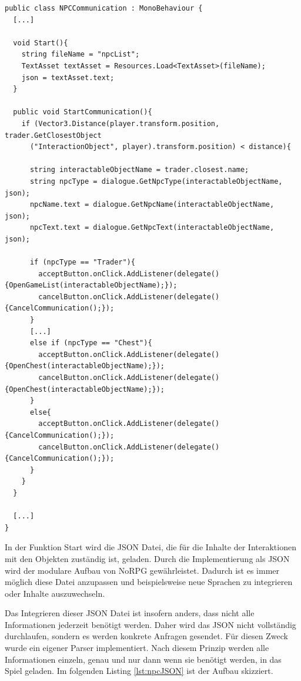 	\begin{scriptsize}
		\lstset{
			float,
			caption=Skript: NPCCommunication.cs, 
			language=[Sharp]C, 
			frame=single,  
			showstringspaces=false, 
			showspaces=false, 
			numbers=left, 
			captionpos=b, 
			belowcaptionskip=4pt,
			basicstyle=\ttfamily
		} 
		\begin{lstlisting}[label=lst:npcComm]
public class NPCCommunication : MonoBehaviour {
  [...]
	
  void Start(){
    string fileName = "npcList";
    TextAsset textAsset = Resources.Load<TextAsset>(fileName);
    json = textAsset.text;
  }

  public void StartCommunication(){
    if (Vector3.Distance(player.transform.position, trader.GetClosestObject
      ("InteractionObject", player).transform.position) < distance){
		
      string interactableObjectName = trader.closest.name;
      string npcType = dialogue.GetNpcType(interactableObjectName, json);
      npcName.text = dialogue.GetNpcName(interactableObjectName, json);
      npcText.text = dialogue.GetNpcText(interactableObjectName, json);

      if (npcType == "Trader"){
        acceptButton.onClick.AddListener(delegate(){OpenGameList(interactableObjectName);});
        cancelButton.onClick.AddListener(delegate(){CancelCommunication();});
      }
      [...]
      else if (npcType == "Chest"){
        acceptButton.onClick.AddListener(delegate(){OpenChest(interactableObjectName);});
        cancelButton.onClick.AddListener(delegate(){OpenChest(interactableObjectName);});
      }
      else{
        acceptButton.onClick.AddListener(delegate(){CancelCommunication();});
        cancelButton.onClick.AddListener(delegate(){CancelCommunication();});
      }
    }
  }
		
  [...]
}
		\end{lstlisting}
	\end{scriptsize}
	
			\label{npctext}
			In der Funktion Start wird die \ac{JSON} Datei, die für die Inhalte der Interaktionen mit den Objekten zuständig ist, geladen. Durch die Implementierung als \ac{JSON} wird der modulare Aufbau von NoRPG gewährleistet. Dadurch ist es immer möglich diese Datei anzupassen und beispielsweise neue Sprachen zu integrieren oder Inhalte auszuwechseln. 
	
			Das Integrieren dieser \ac{JSON} Datei ist insofern anders, dass nicht alle Informationen jederzeit benötigt werden. Daher wird das \ac{JSON} nicht vollständig durchlaufen, sondern es werden konkrete Anfragen gesendet. Für diesen Zweck wurde ein eigener Parser implementiert. Nach diesem Prinzip werden alle Informationen einzeln, genau und nur dann wenn sie benötigt werden, in das Spiel geladen. Im folgenden Listing \ref{lst:npcJSON} ist der Aufbau skizziert.
	

